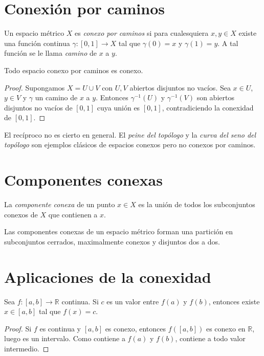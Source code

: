 \section{Conexión por caminos}

\begin{definition}
\label{def:conexo-por-caminos}
Un espacio métrico $X$ es \emph{conexo por caminos} si para cualesquiera $x,y\in X$ existe una función continua $\gamma\colon[0,1]\to X$ tal que $\gamma(0)=x$ y $\gamma(1)=y$. A tal función se le llama \emph{camino} de $x$ a $y$.
\end{definition}

\begin{proposition}
\label{prop:caminos-implica-conexo}
Todo espacio conexo por caminos es conexo.
\end{proposition}
\begin{proof}
Supongamos $X=U\cup V$ con $U,V$ abiertos disjuntos no vacíos. Sea $x\in U$, $y\in V$ y $\gamma$ un camino de $x$ a $y$. Entonces $\gamma^{-1}(U)$ y $\gamma^{-1}(V)$ son abiertos disjuntos no vacíos de $[0,1]$ cuya unión es $[0,1]$, contradiciendo la conexidad de $[0,1]$.
\end{proof}

El recíproco no es cierto en general. El \emph{peine del topólogo} y la \emph{curva del seno del topólogo} son ejemplos clásicos de espacios conexos pero no conexos por caminos.

\section{Componentes conexas}

\begin{definition}
\label{def:componente}
La \emph{componente conexa} de un punto $x\in X$ es la unión de todos los subconjuntos conexos de $X$ que contienen a $x$.
\end{definition}

\begin{proposition}
\label{prop:componentes-propiedades}
Las componentes conexas de un espacio métrico forman una partición en subconjuntos cerrados, maximalmente conexos y disjuntos dos a dos.
\end{proposition}

\section{Aplicaciones de la conexidad}

\begin{theorem}
\label{teo:valor-intermedio}
Sea $f\colon[a,b]\to\mathbb{R}$ continua. Si $c$ es un valor entre $f(a)$ y $f(b)$, entonces existe $x\in[a,b]$ tal que $f(x)=c$.
\end{theorem}
\begin{proof}
Si $f$ es continua y $[a,b]$ es conexo, entonces $f([a,b])$ es conexo en $\mathbb{R}$, luego es un intervalo. Como contiene a $f(a)$ y $f(b)$, contiene a todo valor intermedio.
\end{proof}

